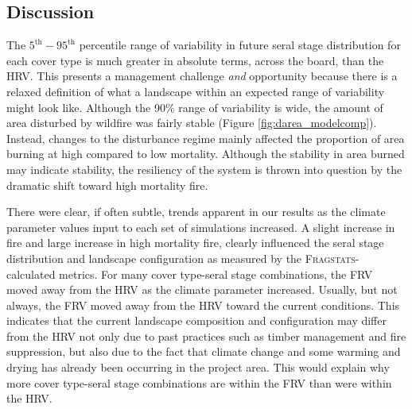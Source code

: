 \documentclass[12pt]{article}
\begin{document}
\begin{spacing}{1}

\section*{Discussion}


The $5^{\text{th}} - 95^{\text{th}}$ percentile range of variability in future seral stage distribution for each cover type is much greater in absolute terms, across the board, than the HRV. This presents a management challenge \emph{and} opportunity because there is a relaxed definition of what a landscape within an expected range of variability might look like. Although the 90\% range of variability is wide, the amount of area disturbed by wildfire was fairly stable (Figure \ref{fig:darea_modelcomp}). Instead, changes to the disturbance regime mainly affected the proportion of area burning at high compared to low mortality. Although the stability in area burned may indicate stability, the resiliency of the system is thrown into question by the dramatic shift toward high mortality fire.

There were clear, if often subtle, trends apparent in our results as the climate parameter values input to each set of simulations increased. A slight increase in fire and large increase in high mortality fire, clearly influenced the seral stage distribution and landscape configuration as measured by the \textsc{Fragstats}-calculated metrics. For many cover type-seral stage combinations, the FRV moved away from the HRV as the climate parameter increased. Usually, but not always, the FRV moved away from the HRV toward the current conditions. This indicates that the current landscape composition and configuration may differ from the HRV not only due to past practices such as timber management and fire suppression, but also due to the fact that climate change and some warming and drying has already been occurring in the project area. This would explain why more cover type-seral stage combinations are within the FRV than were within the HRV.


\end{spacing}
\end{document}
